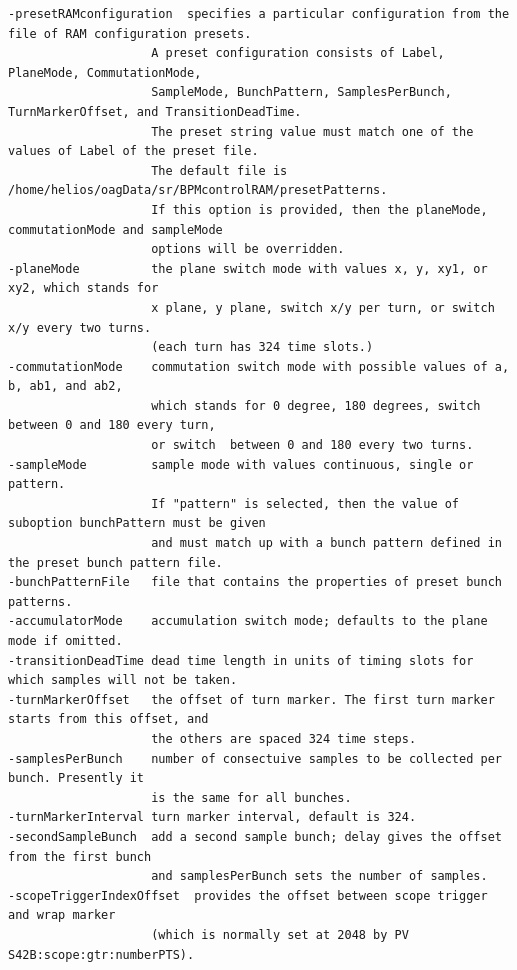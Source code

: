 \begin{itemize}
\begin{verbatim}
-presetRAMconfiguration  specifies a particular configuration from the file of RAM configuration presets.
                    A preset configuration consists of Label, PlaneMode, CommutationMode, 
                    SampleMode, BunchPattern, SamplesPerBunch, TurnMarkerOffset, and TransitionDeadTime. 
                    The preset string value must match one of the values of Label of the preset file. 
                    The default file is /home/helios/oagData/sr/BPMcontrolRAM/presetPatterns. 
                    If this option is provided, then the planeMode, commutationMode and sampleMode 
                    options will be overridden. 
-planeMode          the plane switch mode with values x, y, xy1, or xy2, which stands for 
                    x plane, y plane, switch x/y per turn, or switch x/y every two turns. 
                    (each turn has 324 time slots.) 
-commutationMode    commutation switch mode with possible values of a, b, ab1, and ab2, 
                    which stands for 0 degree, 180 degrees, switch between 0 and 180 every turn, 
                    or switch  between 0 and 180 every two turns. 
-sampleMode         sample mode with values continuous, single or pattern.
                    If "pattern" is selected, then the value of suboption bunchPattern must be given
                    and must match up with a bunch pattern defined in the preset bunch pattern file.
-bunchPatternFile   file that contains the properties of preset bunch patterns.
-accumulatorMode    accumulation switch mode; defaults to the plane mode if omitted.
-transitionDeadTime dead time length in units of timing slots for which samples will not be taken.
-turnMarkerOffset   the offset of turn marker. The first turn marker starts from this offset, and
                    the others are spaced 324 time steps.
-samplesPerBunch    number of consectuive samples to be collected per bunch. Presently it
                    is the same for all bunches.
-turnMarkerInterval turn marker interval, default is 324.
-secondSampleBunch  add a second sample bunch; delay gives the offset from the first bunch
                    and samplesPerBunch sets the number of samples.
-scopeTriggerIndexOffset  provides the offset between scope trigger and wrap marker
                    (which is normally set at 2048 by PV S42B:scope:gtr:numberPTS).


\end{verbatim}
\end{itemize}
